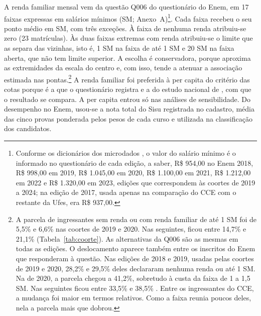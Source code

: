 \documentclass[12pt,a4paper]{article}
\begin{document}
A renda familiar mensal vem da questão Q006 do questionário do Enem, em 17 faixas expressas em salários mínimos (SM; Anexo~A)\footnote{Conforme os dicionários dos microdados \citep{inep2024dicionarios}, o valor do salário mínimo é o informado no questionário de cada edição, a saber, R\$ 954,00 no Enem 2018, R\$ 998,00 em 2019, R\$ 1.045,00 em 2020, R\$ 1.100,00 em 2021, R\$ 1.212,00 em 2022 e R\$ 1.320,00 em 2023, edições que correspondem às coortes de 2019 a 2024; na edição de 2017, usada apenas na comparação do CCE com o restante da Ufes, era R\$ 937,00.}. Cada faixa recebeu o seu ponto médio em SM, com três exceções. À faixa de nenhuma renda atribuiu-se zero (23 matrículas). Às duas faixas extremas com renda atribuiu-se o limite que as separa das vizinhas, isto é, 1 SM na faixa de até 1 SM e 20 SM na faixa aberta, que não tem limite superior. A escolha é conservadora, porque aproxima as extremidades da escala do centro e, com isso, tende a atenuar a associação estimada nas pontas.\footnote{A parcela de ingressantes sem renda ou com renda familiar de até 1 SM foi de 5,5\% e 6,6\% nas coortes de 2019 e 2020. Nas seguintes, ficou entre 14,7\% e 21,1\% (Tabela~\ref{tab:coorte}). As alternativas da Q006 são as mesmas em todas as edições. O deslocamento aparece também entre os inscritos do Enem que responderam à questão. Nas edições de 2018 e 2019, usadas pelas coortes de 2019 e 2020, 28,2\% e 29,5\% deles declararam nenhuma renda ou até 1 SM. Na de 2020, a parcela chegou a 41,2\%, sobretudo à custa da faixa de 1 a 1,5 SM. Nas seguintes ficou entre 33,5\% e 38,5\% \citep{inep2024dicionarios}. Entre os ingressantes do CCE, a mudança foi maior em termos relativos. Como a faixa reunia poucos deles, nela a parcela mais que dobrou.} A renda familiar foi preferida à per capita do critério das cotas porque é a que o questionário registra e a do estudo nacional de \citet{paulaDESIGUALDADESAPOSACESSO2024}, com que o resultado se compara. A per capita entrou só nas análises de sensibilidade. Do desempenho no Enem, usou-se a nota total do Sisu registrada no cadastro, média das cinco provas ponderada pelos pesos de cada curso e utilizada na classificação dos candidatos.
\end{document}
